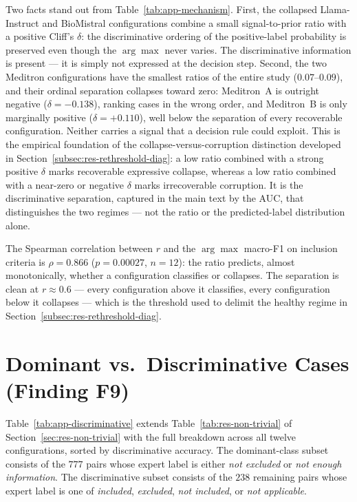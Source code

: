 Two facts stand out from Table~\ref{tab:app-mechanism}. First, the 
collapsed Llama-Instruct and BioMistral configurations combine a small 
signal-to-prior ratio with a positive Cliff's $\delta$: the 
discriminative ordering of the positive-label probability is preserved 
even though the $\arg\max$ never varies. The discriminative information 
is present --- it is simply not expressed at the decision step. Second, 
the two Meditron configurations have the smallest ratios of the entire 
study ($0.07$--$0.09$), and their ordinal separation collapses toward 
zero: Meditron~A is outright negative ($\delta = -0.138$), ranking cases 
in the wrong order, and Meditron~B is only marginally positive 
($\delta = +0.110$), well below the separation of every recoverable 
configuration. Neither carries a signal that a decision rule could 
exploit. This is the empirical foundation of the 
collapse-versus-corruption distinction developed in 
Section~\ref{subsec:res-rethreshold-diag}: a low ratio combined with a 
strong positive $\delta$ marks recoverable expressive collapse, whereas a 
low ratio combined with a near-zero or negative $\delta$ marks 
irrecoverable corruption. It is the discriminative separation, captured 
in the main text by the AUC, that distinguishes the two regimes --- not 
the ratio or the predicted-label distribution alone.

The Spearman correlation between $r$ and the $\arg\max$ macro-F1 on 
inclusion criteria is $\rho = 0.866$ ($p = 0.00027$, $n = 12$): the ratio 
predicts, almost monotonically, whether a configuration classifies or 
collapses. The separation is clean at $r \approx 0.6$ --- every 
configuration above it classifies, every configuration below it collapses 
--- which is the threshold used to delimit the healthy regime in 
Section~\ref{subsec:res-rethreshold-diag}.

\section{Dominant vs.\ Discriminative Cases (Finding F9)}
\label{sec:app-discriminative}

Table~\ref{tab:app-discriminative} extends Table~\ref{tab:res-non-trivial} 
of Section~\ref{sec:res-non-trivial} with the full breakdown across all 
twelve configurations, sorted by discriminative accuracy. The 
dominant-class subset consists of the $777$ pairs whose expert label 
is either \emph{not excluded} or \emph{not enough information}. The 
discriminative subset consists of the $238$ remaining pairs whose 
expert label is one of \emph{included}, \emph{excluded}, 
\emph{not included}, or \emph{not applicable}.

